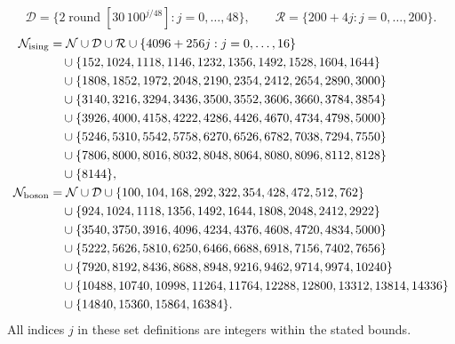 \begin{equation}\mathcal D=\{2\operatorname{round}[30\,100^{j/48}]:j=0,\ldots,48\},\qquad \mathcal R=\{200+4j:j=0,\ldots,200\}.\label{eq:dense-grid}\end{equation}
\begin{align}
\mathcal N_{\rm ising}&=\mathcal N\cup\mathcal D\cup\mathcal R\cup\{4096+256j:j=0,\ldots,16\}\nonumber\\
&\quad\cup\{152,1024,1118,1146,1232,1356,1492,1528,1604,1644\}\nonumber\\
&\quad\cup\{1808,1852,1972,2048,2190,2354,2412,2654,2890,3000\}\nonumber\\
&\quad\cup\{3140,3216,3294,3436,3500,3552,3606,3660,3784,3854\}\nonumber\\
&\quad\cup\{3926,4000,4158,4222,4286,4426,4670,4734,4798,5000\}\nonumber\\
&\quad\cup\{5246,5310,5542,5758,6270,6526,6782,7038,7294,7550\}\nonumber\\
&\quad\cup\{7806,8000,8016,8032,8048,8064,8080,8096,8112,8128\}\nonumber\\
&\quad\cup\{8144\},\nonumber\\
\mathcal N_{\rm boson}&=\mathcal N\cup\mathcal D\cup\{100,104,168,292,322,354,428,472,512,762\}\nonumber\\
&\quad\cup\{924,1024,1118,1356,1492,1644,1808,2048,2412,2922\}\nonumber\\
&\quad\cup\{3540,3750,3916,4096,4234,4376,4608,4720,4834,5000\}\nonumber\\
&\quad\cup\{5222,5626,5810,6250,6466,6688,6918,7156,7402,7656\}\nonumber\\
&\quad\cup\{7920,8192,8436,8688,8948,9216,9462,9714,9974,10240\}\nonumber\\
&\quad\cup\{10488,10740,10998,11264,11764,12288,12800,13312,13814,14336\}\nonumber\\
&\quad\cup\{14840,15360,15864,16384\}.
\label{eq:extended-grid}\end{align}
All indices $j$ in these set definitions are integers within the stated bounds.
